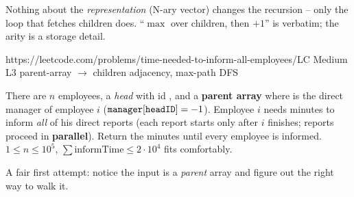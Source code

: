 
\begin{insightbox}
Nothing about the \emph{representation} (N-ary  vector) changes the
recursion -- only the loop that fetches children does. ``$\max$ over children, then $+1$''
is  verbatim; the arity is a storage detail.
\end{insightbox}

  {https://leetcode.com/problems/time-needed-to-inform-all-employees/}{LC Medium L3}
  {parent-array $\to$ children adjacency, max-path DFS}

\begin{problemstatement}
There are $n$ employees, a \emph{head} with id , and a \textbf{parent array}
 where  is the direct manager of employee $i$
($\texttt{manager}[\texttt{headID}] = -1$). Employee $i$ needs  minutes to
inform \emph{all} of his direct reports (each report starts only after $i$ finishes;
reports proceed in \textbf{parallel}). Return the minutes until every employee is
informed. $1 \le n \le 10^5$, $\sum \text{informTime} \le 2\cdot10^4$ fits comfortably.
\end{problemstatement}

\begin{attemptgate}
A fair first attempt: notice the input is a \emph{parent} array and figure out the right
way to walk it.
\end{attemptgate}

